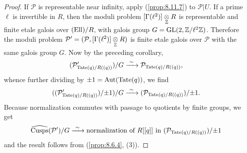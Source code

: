 \begin{proof}
If $\mathcal{P}$ is representable near infinity, apply (\ref{prop:8.11.7}) to $\mathcal{P}|U$. If a prime $\ell$ is invertible in $R$, then the moduli problem $[\Gamma(\ell^2)] \underset{\mathbb{Z}}{\otimes} R$ is representable and finite etale galois over $(\mathrm{Ell})/R$, with galois group $G = \operatorname{GL}(2, \mathbb{Z}/\ell^2\mathbb{Z})$. Therefore the moduli problem $\mathcal{P}' = (\mathcal{P}, [\Gamma(\ell^2)] \underset{\mathbb{Z}}{\otimes} R)$ is finite etale galois over $\mathcal{P}$ with the same galois group $G$. Now by the preceding corollary,
\[
(\mathcal{P}'_{\Tate(q)/R((q))})/G \xrightarrow{\ \sim\ } \mathcal{P}_{\Tate(q)/R((q))} ,
\]
whence further dividing by $\pm 1 = \operatorname{Aut}(\mathrm{Tate}(q))$, we find
\[
((\mathcal{P}'_{\mathrm{Tate}(q)/R((q))})/{\pm 1})/G \xrightarrow{\ \sim\ } (\mathcal{P}_{\mathrm{Tate}(q)/R((q))})/{\pm 1} .
\]
Because normalization commutes with passage to quotients by finite groups, we get
\[
\widehat{\mathrm{Cusps}}(\mathcal{P}')/G \xrightarrow{\ \sim\ } \text{normalization of } R[[q]] \text{ in } (\mathcal{P}_{\mathrm{Tate}(q)/R((q))})/{\pm 1}
\]
and the result follows from (\ref{prop:8.6.4}, (3)).
\end{proof}
